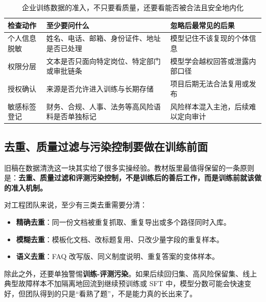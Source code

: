 \begin{table}[H]
\centering
\small
\begin{tabularx}{\textwidth}{>{\raggedright\arraybackslash}p{3cm}>{\raggedright\arraybackslash}p{3.2cm}>{\raggedright\arraybackslash}X}
\toprule
\textbf{检查动作} & \textbf{至少要问什么} & \textbf{忽略后最常见的后果} \\
\midrule
个人信息脱敏 & 姓名、电话、邮箱、身份证件、地址是否已处理 & 模型记住不该复现的个体信息 \\
权限分层 & 文本是否只面向特定岗位、特定部门或审批链条 & 模型学会越权回答或泄露内部口径 \\
授权确认 & 来源是否允许进入训练与长期存储 & 项目后期无法合法复用或发布 \\
敏感标签登记 & 财务、合规、人事、法务等高风险语料是否单独标记 & 风险样本混入主池，后续难以定向审计 \\
\bottomrule
\end{tabularx}
\caption{企业训练数据的准入，不只要看质量，还要看能否被合法且安全地内化}
\label{tab:data-privacy-gate}
\end{table}

\subsection{去重、质量过滤与污染控制要做在训练前面}
旧稿在数据清洗这一块其实给了很多实操经验。教材版里最值得保留的一条原则是：\textbf{去重、质量过滤和评测污染控制，不是训练后的善后工作，而是训练前就该做的准入机制。}

对工程团队来说，至少有三类去重需要分清：
\begin{itemize}
  \item \textbf{精确去重}：同一份文档被重复抓取、重复导出或多个路径同时入库。
  \item \textbf{模糊去重}：模板化文档、改标题复用、只改少量字段的重复样本。
  \item \textbf{语义去重}：FAQ 改写版、同义制度说明、重复答案的变体样本。
\end{itemize}

除此之外，还要单独警惕\textbf{训练-评测污染}。如果后续回归集、高风险保留集、线上典型故障样本不加隔离地回流到继续预训练或 SFT 中，模型分数可能会快速变好，但团队得到的只是“看熟了题”，不是能力真的长出来了。

